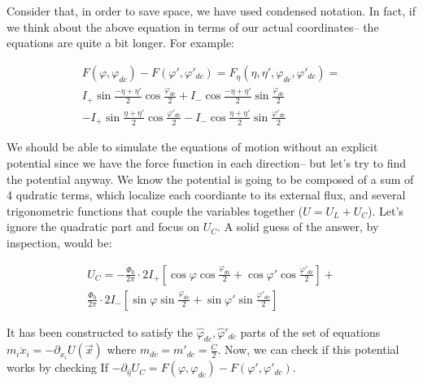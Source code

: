 \documentclass[paper=a4, twocolumn, fontsize=10pt]{article} %
\numberwithin{equation}{section} %
\numberwithin{figure}{section} %
\numberwithin{table}{section} %
\def \df#1{\hat{#1}}
\def \dl#1{#1}
\begin{document}
Consider that, in order to save space, we have used condensed notation. In fact, if we think about the above equation in terms of our actual coordinates-- the equations are quite a bit longer. For example:


\begin{multline}
    F(\dl\varphi, \dl\varphi_{dc}) - F(\dl\varphi', \dl\varphi'_{dc}) = F_{\df\eta}(\dl\eta,\dl\eta',\dl\varphi_{dc},\dl\varphi'_{dc})   =  \\
    I_{+} \sin \frac{-\dl\eta+\dl\eta'}{2} \cos \frac{\dl\varphi_{dc}}{2} + I_{-} \cos \frac{-\dl\eta+\dl\eta'}{2} \sin \frac{\dl\varphi_{dc}}{2} \\
    - I_{+} \sin \frac{\dl\eta+\dl\eta'}{2} \cos \frac{\dl\varphi'_{dc}}{2} - I_{-} \cos \frac{\dl\eta+\dl\eta'}{2} \sin \frac{\dl\varphi'_{dc}}{2} 
\end{multline}

We should be able to simulate the equations of motion without an explicit potential since we have the force function in each direction-- but let's try to find the potential anyway. We know the potential is going to be composed of a sum of 4 qudratic terms, which localize each coordiante to its external flux, and several trigonometric functions that couple the variables together ($U=U_L+ U_C$). Let's ignore the quadratic part and focus on $U_C$. A solid guess of the answer, by inspection, would be:

\begin{multline}
U_C = -\frac{\Phi_0}{2\pi}\cdot 2 I_+ \left[ \cos\dl\varphi\cos\frac{\dl\varphi_{dc}}{2} + \cos\dl\varphi'\cos\frac{\dl\varphi'_{dc}}{2} \right] + \\
\frac{\Phi_0}{2\pi}\cdot 2 I_- \left[ \sin\dl\varphi\sin\frac{\dl\varphi_{dc}}{2} + \sin\dl\varphi'\sin\frac{\dl\varphi'_{dc}}{2} \right]
\end{multline}

It has been constructed to satisfy the $\df\varphi_{dc}, \df\varphi'_{dc}$ parts of the set of equations $m_i \ddot{x}_i = -\partial_{x_i} U(\vec{x})$ where $m_{dc} = m'_{dc} = \frac{C}{2} $. Now, we can check if this potential works by checking If $-\partial_{\df\eta} U_C = F(\dl\varphi, \dl\varphi_{dc}) - F(\dl\varphi', \dl\varphi'_{dc}) $.
\end{document}
